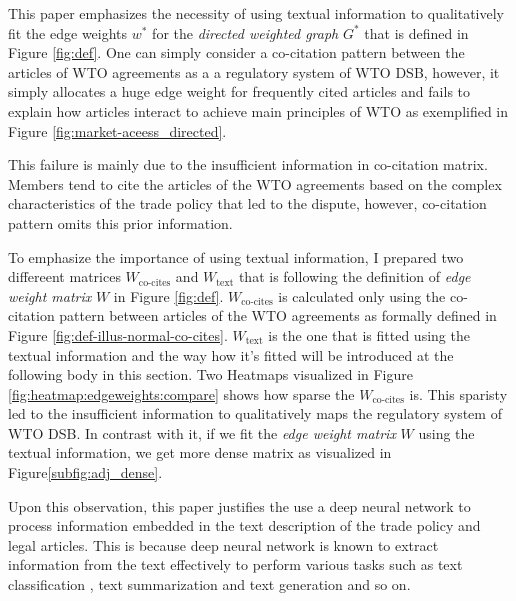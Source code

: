 This paper emphasizes the necessity of using textual information 
to qualitatively fit the edge weights $w^*$ for the \textit{directed weighted graph} $G^*$ that is defined in Figure \ref{fig:def}. 
One can simply consider a co-citation pattern between the articles of WTO agreements as a a regulatory system of WTO DSB, however,
it simply allocates a huge edge weight for frequently cited articles and fails to explain how articles interact to achieve main principles of WTO as exemplified in Figure \ref{fig:market-aceess_directed}.

This failure is mainly due to the insufficient information in co-citation matrix. Members tend to cite the articles of 
the WTO agreements based on the complex characteristics of 
the trade policy that led to the dispute, however, co-citation pattern omits this prior information.

To emphasize the importance of using textual information, I prepared two differeent matrices $W_{\text{co-cites}}$ and $W_{\text{text}}$ that is following the definition of \textit{edge weight matrix} $W$ in Figure \ref{fig:def}.
$W_{\text{co-cites}}$ is calculated only using the co-citation pattern between articles of the WTO agreements as formally defined in Figure \ref{fig:def-illus-normal-co-cites}. 
$W_{\text{text}}$ is the one that is fitted using the textual information and the way how it's fitted will be introduced at the following body in this section.
Two Heatmaps visualized in Figure \ref{fig:heatmap:edgeweights:compare} shows how sparse the $W_{\text{co-cites}}$ is. This sparisty led to the insufficient information
to qualitatively maps the regulatory system of WTO DSB. In contrast with it, if we fit the \textit{edge weight matrix} $W$ using the textual information, we get more dense matrix as visualized in Figure\ref{subfig:adj_dense}.




Upon this observation, this paper justifies the use a deep neural network to process information embedded in the text description of the trade policy and legal articles. This is because deep neural network is known to 
extract information from the text effectively to perform various tasks such as text classification \citep{minaee2020deep}, text summarization \citep{textsum} and text generation \citep{guo2017long} and so on.





